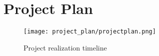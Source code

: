 \chapter{Project Plan}


\begin{figure}[h]
    \centering
    \texttt{[image: project\_plan/projectplan.png]}
    \caption{Project realization timeline}
    \label{fig:projPlan}
\end{figure}
